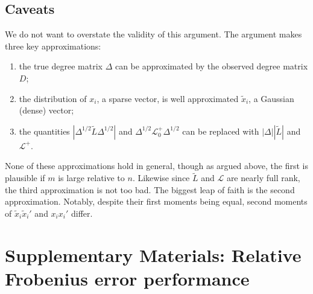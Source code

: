 \documentclass[12pt]{article}
\theoremstyle{plain}
\begin{document}
\subsection{Caveats}

We do not want to overstate the validity of this argument.  The
argument makes three key approximations:
\begin{enumerate}
\item the true degree matrix $\Delta$ can be
  approximated by the observed degree matrix $D$;
\item the distribution of $x_i$, a sparse vector, is well approximated
  $\tilde x_i$, a Gaussian (dense) vector;
\item the quantities
  $| \Delta^{1/2} \tilde L \Delta^{1/2}|$
  and
  $\Delta^{1/2} \mathcal{L}_0^+ \Delta^{1/2}$
  can be replaced with
  $|\Delta| |\tilde L|$
  and $\mathcal{L}^+$.
\end{enumerate}
None of these approximations hold in general, though as argued above,
the first is plausible if $m$ is large relative to $n$.  Likewise
since $\tilde L$ and $\mathcal{L}$ are nearly full rank, the third
approximation is not too bad.  The biggest leap of faith is the second
approximation.  Notably, despite their first moments being equal,
second moments of $\tilde x_i \tilde x_i'$ and $x_i x_i'$ differ.

\clearpage
\section{Supplementary Materials: Relative Frobenius error performance}
\label{S:frobenius-peformance}

\end{document}
